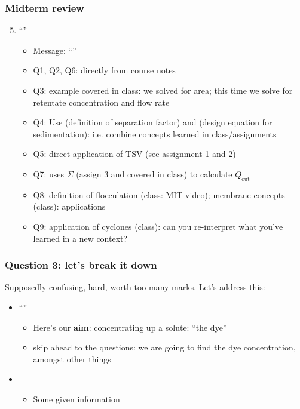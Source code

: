 \begin{frame}\frametitle{Midterm review}
	\begin{enumerate}
		\setcounter{enumi}{4}
		\item	``{\color{myOrange}{Unprepared}}''
		\begin{itemize}
			\item	Message: ``{\color{myOrange}{i felt and i feel many others felt that attending the lectures and completing the homework assignments would not have prepared us well for this test ... evidently the test had very little similarity to class examples or assignments}}''
			\item	Q1, Q2, Q6: directly from course notes
			\item	Q3: example covered in class: we solved for area; this time we solve for retentate concentration and flow rate
			\item	Q4: Use (definition of separation factor) and (design equation for sedimentation): i.e. combine concepts learned in class/assignments
			\item	Q5: direct application of TSV (see assignment 1 and 2)
			\item	Q7: uses $\Sigma$ (assign 3 and covered in class) to calculate $Q_\text{cut}$
			\item	Q8: definition of flocculation (class: MIT video); membrane concepts (class): applications
			\item	Q9: application of cyclones (class): can you re-interpret what you've learned in a new context?
		\end{itemize}
	\end{enumerate}	
\end{frame}

\begin{frame}\frametitle{Question 3: let's break it down}
	Supposedly confusing, hard, worth too many marks. Let's address this:
	\begin{itemize}
		\item	``{\color{myGreen}{An asymmetric ultrafiltration membrane is used with the aim of separating dyes from a liquid stream and to achieve a more concentrated dye-water mixture}}''
		\begin{itemize}
			\item	Here's our \textbf{aim}: concentrating up a solute: ``the dye''
			\item	skip ahead to the questions: we are going to find the dye concentration, amongst other things
		\end{itemize}			
		\vspace{24pt}
		\item	{}
		\begin{itemize}
			\item	Some given information
		\end{itemize}
	\end{itemize}
\end{frame}

